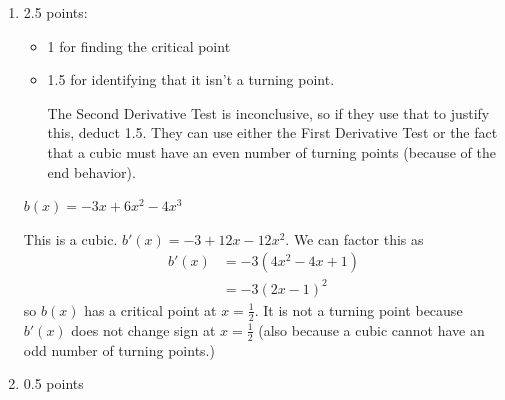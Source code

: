 \documentclass{article}
\begin{document}
\begin{enumerate}
\begin{enumerate}
\begin{enumerate}
      \begin{problem}[\vfill]
        $a(x) = x (x^2 + 7)$
      \end{problem}

      \begin{solution}
        This is a cubic. $a(x)=x^3+7x$, so $a'(x)=3x^2+7$. Since $a'(x)$
        has no real roots, $a(x)$ has no critical points and no turning
        points.
      \end{solution}

    \item

      \begin{grading}
        2.5 points:
        \begin{itemize}[itemsep=0pt, topsep=0pt]
        \item 1 for finding the critical point
        \item 1.5 for identifying that it isn't a turning point.

          The Second Derivative Test is inconclusive, so if they use that to justify this, deduct 1.5. They can use either the First Derivative Test or the fact that a cubic must have an even number of turning points (because of the end behavior).
        \end{itemize}
      \end{grading}

      \begin{problem}[\vfill]
        $b(x) = -3x + 6x^2 - 4x^3$
      \end{problem}

      \begin{solution}
        This is a cubic. $b'(x)=-3+12x-12x^2$. We can factor
        this as
        \begin{align*}
          b'(x) &= -3(4x^2 -4x + 1) \\
          &= -3(2x-1)^2
        \end{align*}
        so $b(x)$ has a critical point at $x=\frac{1}{2}$. It
        is not a turning point because $b'(x)$ does not change sign
        at $x=\frac{1}{2}$ (also because a cubic cannot have an odd
        number of turning points.)
      \end{solution}

    \item

      \begin{grading}
        0.5 points
      \end{grading}


\end{enumerate}
\end{enumerate}
\end{enumerate}
\end{document}
